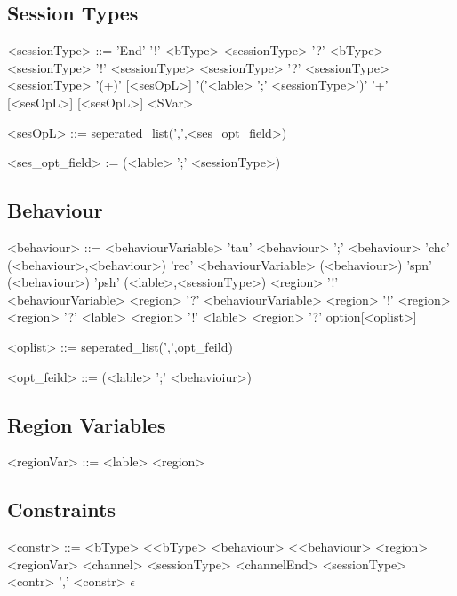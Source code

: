 \documentclass[12pt]{article}
\begin{document}
\subsection{Session Types}

\begin{grammar}

<sessionType> ::= 'End'
\alt '!' <bType> <sessionType>
\alt '?' <bType> <sessionType>
\alt '!' <sessionType> <sessionType>
\alt '?' <sessionType> <sessionType>
\alt '(+)' [<sesOpL>] '('<lable> ';' <sessionType>')'
\alt '+' [<sesOpL>] [<sesOpL>]
\alt <SVar>

<sesOpL> ::= seperated_list(',',<ses_opt_field>)

<ses_opt_field> := (<lable> ';' <sessionType>)

\end{grammar}

\subsection{Behaviour}

\begin{grammar}

<behaviour> ::= <behaviourVariable>
\alt 'tau'
\alt <behaviour> ';' <behaviour>
\alt 'chc' (<behaviour>,<behaviour>)
\alt 'rec' <behaviourVariable> (<behaviour>)
\alt 'spn' (<behaviour>)
\alt 'psh' (<lable>,<sessionType>)
\alt <region> '!' <behaviourVariable>
\alt <region> '?' <behaviourVariable>
\alt <region> '!' <region>
\alt <region> '?' <lable>
\alt <region> '!' <lable>
\alt <region> '?' option[<oplist>]

<oplist> ::= seperated_list(',',opt_feild)

<opt_feild> ::= (<lable> ';' <behavioiur>)

\end{grammar}

\subsection {Region Variables}

\begin{grammar}

<regionVar> ::= <lable>
\alt <region>

\end{grammar}

\subsection{Constraints}

\begin{grammar}

<constr> ::= <bType> \textless <bType>
\alt <behaviour> \textless <behaviour>
\alt <region> \texttildelow <regionVar>
\alt <channel> \texttildelow <sessionType>
\alt <channelEnd> \texttildelow <sessionType>
\alt <contr> ',' <constr>
\alt $\epsilon$

\end{grammar}


\end{document}
